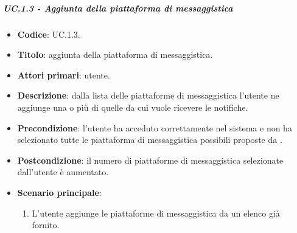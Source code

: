 	\subparagraph{UC\theuccount.1.3 - Aggiunta della piattaforma di messaggistica}
	\begin{itemize}
		\item \textbf{Codice}: UC\theuccount.1.3.
		\item \textbf{Titolo}: aggiunta della piattaforma di messaggistica.
		\item \textbf{Attori primari}: utente.
		\item \textbf{Descrizione}: dalla lista delle piattaforme di messaggistica l'utente ne aggiunge una o più di quelle da cui vuole ricevere le notifiche.
		\item \textbf{Precondizione}: l'utente ha acceduto correttamente nel sistema e non ha selezionato tutte le piattaforma di messaggistica possibili proposte da \progetto.
		\item \textbf{Postcondizione}: il numero di piattaforme di messaggistica selezionate dall'utente è aumentato.
		\item \textbf{Scenario principale}:
		\begin{enumerate}
			\item L'utente aggiunge le piattaforme di messaggistica da un elenco già fornito.
		\end{enumerate} 
	\end{itemize}
			



